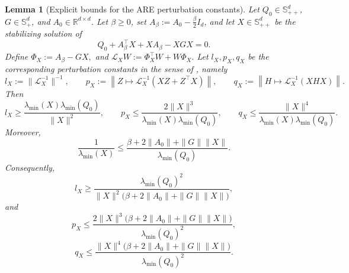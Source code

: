 \documentclass[a4paper, 10pt, english, reqno]{amsart}
\newtheorem{lemma}[theorem]{Lemma}
\begin{document}
\begin{lemma}[Explicit bounds for the ARE perturbation constants]
    \label{lem:sun_constants_explicit_beta}
    Let $Q_0\in\mathbb S_{++}^d$, $G\in\mathbb S_+^d$, and $A_0\in\mathbb R^{d\times d}$. Let $\beta\ge0$, set $A_\beta:=A_0-\frac{\beta}{2}I_d$, and let $X\in\mathbb S_{++}^d$ be the stabilizing solution of
    \begin{equation}
    \label{eq:generic_discounted_CARE}
        Q_0+A_\beta^\top X+XA_\beta-XGX=0.
    \end{equation}
    Define $\Phi_X:=A_\beta-GX,$ and $\mathcal L_X W:=\Phi_X^\top W+W\Phi_X.$ Let $l_X,p_X,q_X$ be the corresponding perturbation constants in the
    sense of \cite[Theorem~3.1]{Sun1998}, namely
    \[
        l_X:=\|\mathcal L_X^{-1}\|^{-1},\qquad
        p_X:=
        \left\|
        Z\mapsto \mathcal L_X^{-1}(XZ+Z^\top X)
        \right\|,
        \qquad
        q_X:=
        \left\|
        H\mapsto \mathcal L_X^{-1}(XHX)
        \right\|.
    \]
    Then
    \begin{equation}
    \label{eq:sun_pq_bound_explicit_beta}
     l_X
        \ge
        \frac{\lambda_{\min}(X)\lambda_{\min}(Q_0)}{\|X\|^2},\qquad    p_X
        \le
        \frac{2\|X\|^3}
        {\lambda_{\min}(X)\lambda_{\min}(Q_0)},
        \qquad
        q_X
        \le
        \frac{\|X\|^4}
        {\lambda_{\min}(X)\lambda_{\min}(Q_0)}.
    \end{equation}
    Moreover,
    \begin{equation}
    \label{eq:X_min_lower_beta}
        \frac{1}{\lambda_{\min}(X)}
        \le
        \frac{
          \beta+2\|A_0\|+\|G\|\|X\|
        }{
          \lambda_{\min}(Q_0)
        }.
    \end{equation}
    Consequently,
    \begin{equation}
    \label{eq:sun_l_bound_beta_visible}
        l_X
        \ge
        \frac{\lambda_{\min}(Q_0)^2}
        {\|X\|^2\bigl(\beta+2\|A_0\|+\|G\|\|X\|\bigr)},
    \end{equation}
    and
    \begin{equation}
    \label{eq:sun_p_bound_beta_visible}
        p_X
        \le
        \frac{
          2\|X\|^3
          \bigl(\beta+2\|A_0\|+\|G\|\|X\|\bigr)
        }{
          \lambda_{\min}(Q_0)^2
        },
    \end{equation}
    \begin{equation}
    \label{eq:sun_q_bound_beta_visible}
        q_X
        \le
        \frac{
          \|X\|^4
          \bigl(\beta+2\|A_0\|+\|G\|\|X\|\bigr)
        }{
          \lambda_{\min}(Q_0)^2
        }.
    \end{equation}
    \end{lemma}
    
\end{document}
